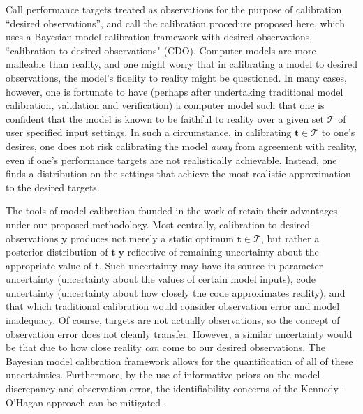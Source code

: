 \documentclass[12pt]{article}
\begin{document}
%
Call performance targets treated as observations for the purpose of calibration ``desired observations'', and call the calibration procedure proposed here, which uses a Bayesian model calibration framework with desired observations, ``calibration to desired observations" (CDO). 
%
Computer models are more malleable than reality, and one might worry that in calibrating a model to desired observations, the model's fidelity to reality might be questioned.
%
%
In many cases, however, one is fortunate to have (perhaps after undertaking traditional model calibration, validation and verification) a computer model such that one is confident that the model is known to be faithful to reality over a given set $\mathcal T$ of user specified input settings.
%
In such a circumstance, in calibrating $\mathbf t\in\mathcal T$ to one's desires, one does not risk calibrating the model \emph{away} from agreement with reality, even if one's performance targets are not realistically achievable. 
%
Instead, one finds a distribution on the settings that achieve the most realistic approximation to the desired targets.

The tools of model calibration founded in the work of \cite{Kennedy2001} retain their advantages under our proposed methodology.
%
Most centrally, calibration to desired observations $\mathbf y$ produces not merely a static optimum $\mathbf t\in\mathcal T$, but rather a posterior distribution of $\mathbf t|\mathbf y$ reflective of remaining uncertainty about the appropriate value of $\mathbf t$. 
%
Such uncertainty may have its source in parameter uncertainty (uncertainty about the values of certain model inputs), code uncertainty (uncertainty about how closely the code approximates reality), and that which traditional calibration would consider observation error and model inadequacy. 
%
Of course,  targets are not actually observations, so the concept of observation error does not cleanly transfer. 
%
However, a similar uncertainty would be that due to how close reality \emph{can} come to our desired observations. 
%
The Bayesian model calibration framework allows for the quantification of all of these uncertainties. 
%
Furthermore, by the use of informative priors on the model discrepancy and observation error, the identifiability concerns of the Kennedy-O'Hagan approach can be mitigated \citep{Bayarri2007,Tuo2016}.
\end{document}
